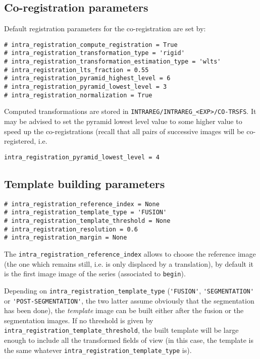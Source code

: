 \subsection{Co-registration parameters}
\label{sec:cli:intraregistration:coregistration}
Default registration parameters for the co-registration are set by:
\begin{verbatim}
# intra_registration_compute_registration = True
# intra_registration_transformation_type = 'rigid'
# intra_registration_transformation_estimation_type = 'wlts'
# intra_registration_lts_fraction = 0.55
# intra_registration_pyramid_highest_level = 6
# intra_registration_pyramid_lowest_level = 3
# intra_registration_normalization = True
\end{verbatim}
Computed transformations are stored in \verb|INTRAREG/INTRAREG_<EXP>/CO-TRSFS|.
It may be advised to set the pyramid lowest level value to some higher value to speed up the co-registrations (recall that all pairs of successive images will be co-registered, i.e.
\begin{verbatim}
intra_registration_pyramid_lowest_level = 4
\end{verbatim}


\subsection{Template building parameters}
\label{sec:cli:intraregistration:template}

\begin{verbatim}
# intra_registration_reference_index = None
# intra_registration_template_type = 'FUSION'
# intra_registration_template_threshold = None
# intra_registration_resolution = 0.6
# intra_registration_margin = None
\end{verbatim}

The \verb|intra_registration_reference_index| allows to choose the reference image (the one which remains still, i.e. is only displaced by a translation), by default it is the first image image of the series (associated to \verb|begin|).

Depending on \verb|intra_registration_template_type| (\verb|'FUSION'|, \verb|'SEGMENTATION'| or \verb|'POST-SEGMENTATION'|, the two latter assume obviously that the segmentation has been done), the \textit{template} image can be built either after the fusion or the segmentation images. If no threshold is given by \verb|intra_registration_template_threshold|, the built template will be large enough to include all the transformed fields of view (in this case, the template is the same whatever \verb|intra_registration_template_type| is). 

